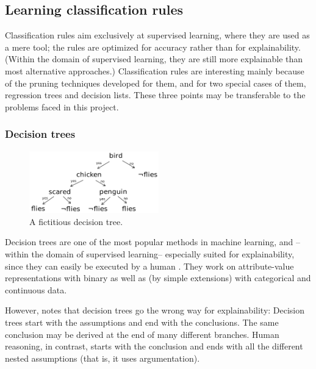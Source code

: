 \subsection{Learning classification rules}

Classification rules aim exclusively at supervised learning, where they are used as a mere tool; the rules are optimized for accuracy rather than for explainability. (Within the domain of supervised learning, they are still more explainable than most alternative approaches.) Classification rules are interesting mainly because of the pruning techniques developed for them, and for two special cases of them, regression trees and decision lists. These three points may be transferable to the problems faced in this project. 

\subsubsection{Decision trees}\label{sec:decision-trees}

\begin{figure}[htb]
        \centering
        \includegraphics[width=0.5\textwidth]{images/decision-tree.png}
        \caption{A fictitious decision tree.}
        \label{fig:decision-tree}
\end{figure}

Decision trees are one of the most popular methods in machine learning, and --within the domain of supervised learning-- especially suited for explainability, since they can easily be executed by a human \cite[ch.~18.3]{russellArtificialIntelligenceModern2010}. They work on attribute-value representations with binary as well as (by simple extensions) with categorical and continuous data.

However, \citet{breidenbachTextCode2021} notes that decision trees go the wrong way for explainability: Decision trees start with the assumptions and end with the conclusions. The same conclusion may be derived at the end of many different branches. Human reasoning, in contrast, starts with the conclusion and ends with all the different nested assumptions (that is, it uses argumentation). 

